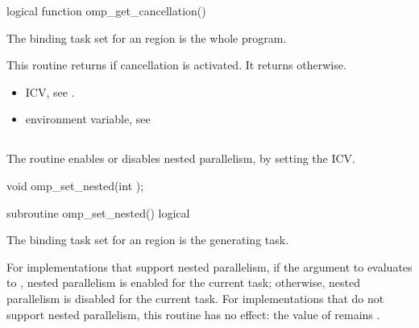 \fortranspecificstart
\begin{boxedcode}
logical function omp\_get\_cancellation()
\end{boxedcode}
\fortranspecificend

\binding
The binding task set for an  region is the whole program.

\effect
This routine returns  if cancellation is activated. It returns  otherwise.

\crossreferences
\begin{itemize}
\item {} ICV, see 
.

\item {} environment variable, see 
\end{itemize}










\subsection{}
\label{subsec:omp_set_nested}
\summary
The  routine enables or disables nested parallelism, by setting the 
 ICV. 

\format
\ccppspecificstart
\begin{boxedcode}
void omp\_set\_nested(int );
\end{boxedcode}
\ccppspecificend

\fortranspecificstart
\begin{boxedcode}
subroutine omp\_set\_nested()
logical 
\end{boxedcode}
\fortranspecificend

\binding
The binding task set for an  region is the generating task. 

\effect
For implementations that support nested parallelism, if the argument to 
 evaluates to , nested parallelism is enabled for the current task; 
otherwise, nested parallelism is disabled for the current task. For implementations that 
do not support nested parallelism, this routine has no effect: the value of  
remains .

